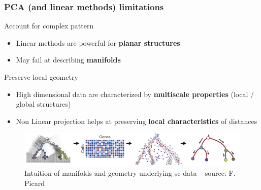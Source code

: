 \documentclass{beamer}\usepackage[]{graphicx}\usepackage[]{color}
\begin{document}
\begin{frame}
  \frametitle{PCA (and linear methods) limitations}

  \begin{block}{Account for complex pattern}
    \begin{itemize}
      \item Linear methods are powerful for \alert{\bf planar structures}
      \item May fail at describing \alert{\bf manifolds}
    \end{itemize}
  \end{block}
  
  \begin{block}{Preserve local geometry}
    \begin{itemize}
      \item High dimensional data are characterized by \alert{\bf multiscale properties} (local / global structures)
      \item Non Linear projection helps at preserving \alert{\bf local characteristics} of distances
    \end{itemize}
  \end{block}

  \vfill
  
   \begin{figure}
     \includegraphics[scale=0.25]{figures/manifold.pdf}
     \caption{\small Intuition of manifolds and geometry underlying sc-data -- {\tiny source: F. Picard}}
   \end{figure}

\end{frame}
\end{document}
